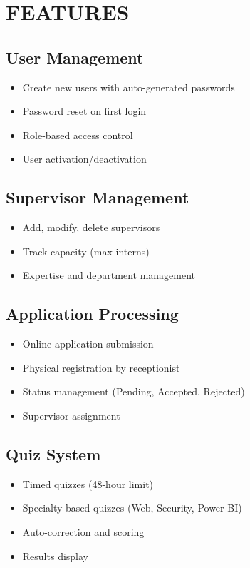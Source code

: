 \documentclass[12pt,a4paper]{report}
\begin{document}
\chapter{FEATURES}

\section{User Management}
\begin{itemize}
    \item Create new users with auto-generated passwords
    \item Password reset on first login
    \item Role-based access control
    \item User activation/deactivation
\end{itemize}

\section{Supervisor Management}
\begin{itemize}
    \item Add, modify, delete supervisors
    \item Track capacity (max interns)
    \item Expertise and department management
\end{itemize}

\section{Application Processing}
\begin{itemize}
    \item Online application submission
    \item Physical registration by receptionist
    \item Status management (Pending, Accepted, Rejected)
    \item Supervisor assignment
\end{itemize}

\section{Quiz System}
\begin{itemize}
    \item Timed quizzes (48-hour limit)
    \item Specialty-based quizzes (Web, Security, Power BI)
    \item Auto-correction and scoring
    \item Results display
\end{itemize}
\end{document}
